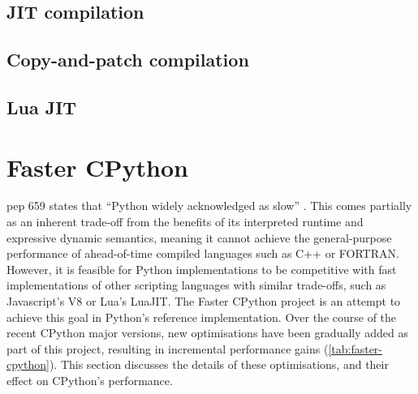 

\subsection{JIT compilation}
\label{ssec:jit-compilation}




\subsection{Copy-and-patch compilation}
\label{ssec:copy-and-patch-compilation}





\subsection{Lua JIT}
\label{ssec:lua-jit}





\section{Faster CPython}
\label{sec:faster-cpython}


\acf{pep} 659 states that ``Python widely acknowledged as slow'' \cite{pep659}.
This comes partially as an inherent trade-off from the benefits of its interpreted runtime and expressive dynamic semantics, meaning it cannot achieve the general-purpose performance of ahead-of-time compiled languages such as C++ or FORTRAN. However, it is feasible for Python implementations to be competitive with fast implementations of other scripting languages with similar trade-offs, such as Javascript's V8 or Lua's LuaJIT. The Faster CPython project is an attempt to achieve this goal in Python's reference implementation. Over the course of the recent CPython major versions, new optimisations have been gradually added as part of this project, resulting in incremental performance gains (\autoref{tab:faster-cpython}).
This section discusses the details of these optimisations, and their effect on CPython's performance.

